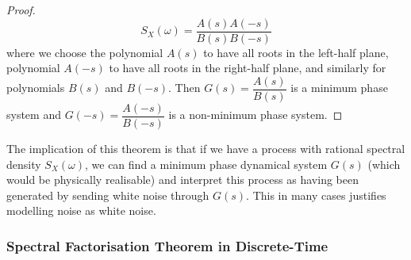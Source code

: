 \documentclass[11pt]{report} %
\begin{document}
\begin{proof}
\begin{equation}
S_{X}\left(\omega\right) = \dfrac{A\left(s\right)A\left(-s\right)}{B\left(s\right)B\left(-s\right)}
\end{equation}
where we choose the polynomial $A\left(s\right)$ to have all roots in the left-half plane, polynomial $A\left(-s\right)$ to have all roots in the right-half plane, and similarly for polynomials $B\left(s\right)$ and $B\left(-s\right)$. Then $G\left(s\right) = \dfrac{A\left(s\right)}{B\left(s\right)}$ is a minimum phase system and $G\left(-s\right) = \dfrac{A\left(-s\right)}{B\left(-s\right)}$ is a non-minimum phase system.
\end{proof}
The implication of this theorem is that if we have a process with rational spectral density $S_{X}\left(\omega\right)$, we can find a minimum phase dynamical system $G\left(s\right)$ (which would be physically realisable) and interpret this process as having been generated by sending white noise through $G\left(s\right)$. This in many cases justifies modelling noise as white noise.

\subsubsection{Spectral Factorisation Theorem in Discrete-Time}
\end{document}
